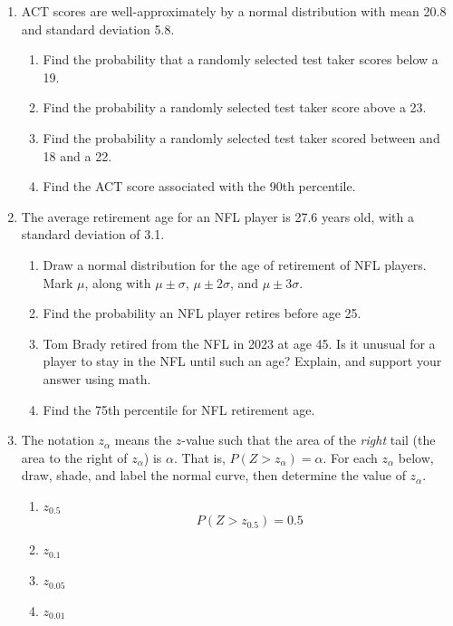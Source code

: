 \documentclass[
]{book}
\providecommand{\tightlist}{%
  \setlength{\itemsep}{0pt}\setlength{\parskip}{0pt}}
\begin{document}
\begin{enumerate}
  \begin{enumerate}
  \def\labelenumii{\alph{enumii}.}
  \tightlist
  \item
    90th percentile
  \item
    45th percentile
  \item
    17th percentile
  \end{enumerate}
\item
  ACT scores are well-approximately by a normal distribution with mean 20.8 and standard deviation 5.8.

  \begin{enumerate}
  \def\labelenumii{\alph{enumii}.}
  \tightlist
  \item
    Find the probability that a randomly selected test taker scores below a 19.
  \item
    Find the probability a randomly selected test taker score above a 23.
  \item
    Find the probability a randomly selected test taker scored between and 18 and a 22.
  \item
    Find the ACT score associated with the 90th percentile.
  \end{enumerate}
\item
  The average retirement age for an NFL player is 27.6 years old, with a standard deviation of 3.1.

  \begin{enumerate}
  \def\labelenumii{\alph{enumii}.}
  \tightlist
  \item
    Draw a normal distribution for the age of retirement of NFL players. Mark \(\mu\), along with \(\mu \pm \sigma\), \(\mu \pm 2\sigma\), and \(\mu \pm 3\sigma\).
  \item
    Find the probability an NFL player retires before age 25.
  \item
    Tom Brady retired from the NFL in 2023 at age 45. Is it unusual for a player to stay in the NFL until such an age? Explain, and support your answer using math.
  \item
    Find the 75th percentile for NFL retirement age.
  \end{enumerate}
\item
  The notation \(z_{\alpha}\) means the \(z\)-value such that the area of the \emph{right} tail (the area to the right of \(z_{\alpha}\)) is \(\alpha\). That is, \(P(Z > z_{\alpha}) =\alpha\). For each \(z_{\alpha}\) below, draw, shade, and label the normal curve, then determine the value of \(z_{\alpha}\).

  \begin{enumerate}
  \def\labelenumii{\alph{enumii}.}
  \tightlist
  \item
    \(z_{0.5}\) \[P(Z > z_{0.5}) =0.5\]
  \item
    \(z_{0.1}\)
  \item
    \(z_{0.05}\)
  \item
    \(z_{0.01}\)
  \end{enumerate}
\end{enumerate}
\end{document}
